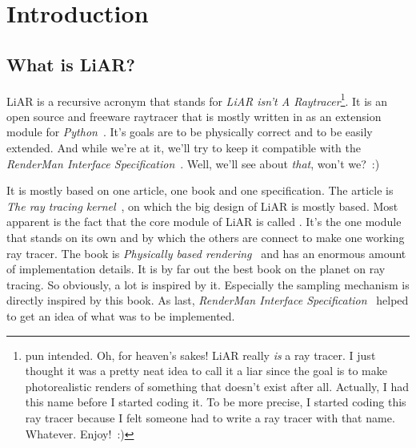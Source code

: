 % 

\chapter{Introduction}

\section{What is LiAR?}

LiAR is a recursive acronym that stands for \emph{LiAR isn't A Raytracer}\footnote{pun intended. Oh, for heaven's sakes! LiAR really \emph{is} a ray tracer.  I just thought it was a pretty neat idea to call it a liar since the goal is to make photorealistic renders of something that doesn't exist after all.  Actually, I had this name before I started coding it.  To be more precise, I started coding this ray tracer because I felt someone had to write a ray tracer with that name.  Whatever.  Enjoy!~:)}.  It is an open source and freeware raytracer that is mostly written in \Cpp  as an extension module for \emph{Python}~\cite{Python}.  It's goals are to be physically correct and to be easily extended.  And while we're at it, we'll try to keep it compatible with the \emph{RenderMan Interface Specification}~\cite{RISpec}.  Well, we'll see about \emph{that}, won't we?~:)

It is mostly based on one article, one book and one specification.  The article is \emph{The ray tracing kernel}~\cite{kirk88ray}, on which the big design of LiAR is mostly based.  Most apparent is the fact that the core module of LiAR is called .  It's the one module that stands on its own and by which the others are connect to make one working ray tracer.  The book is \emph{Physically based rendering}~\cite{Pharr2004pbrt} and has an enormous amount of implementation details. It is by far out the best book on the planet on ray tracing.  So obviously, a lot is inspired by it.  Especially the sampling mechanism is directly inspired by this book.  As last, \emph{RenderMan Interface Specification}~\cite{RISpec} helped to get an idea of what was to be implemented.  

